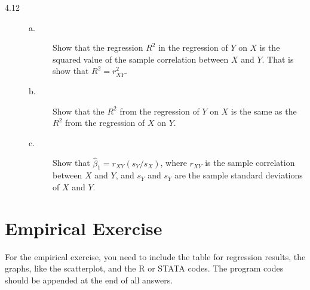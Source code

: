 \documentclass[a4paper,11pt]{article}
\begin{document}
\vspace{0.5cm}

\begin{description}
\item[{4.12}] \begin{description}
\item[{a.}] Show that the regression \(R^2\) in the regression of \(Y\) on
\(X\) is the squared value of the sample correlation between
\(X\) and \(Y\). That is show that \(R^2 = r^2_{XY}\).
\item[{b.}] Show that the \(R^2\) from the regression of \(Y\) on \(X\) is the
same as the \(R^2\) from the regression of \(X\) on \(Y\).
\item[{c.}] Show that \(\hat{\beta}_1 = r_{XY}(s_Y/s_X)\), where \(r_{XY}\)
is the sample correlation between \(X\) and \(Y\), and \(s_Y\) and
\(s_Y\) are the sample standard deviations of \(X\) and \(Y\).
\end{description}
\end{description}

\section*{Empirical Exercise}
\label{sec:orgba8e8a2}

For the empirical exercise, you need to include the table for
regression results, the graphs, like the scatterplot, and the R or
STATA codes. The program codes should be appended at the end of all
answers.
\end{document}
